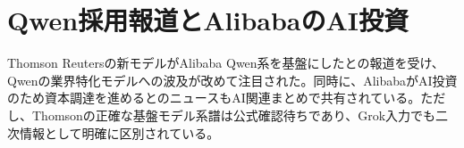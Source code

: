 \section{Qwen採用報道とAlibabaのAI投資}
Thomson Reutersの新モデルがAlibaba Qwen系を基盤にしたとの報道を受け、Qwenの業界特化モデルへの波及が改めて注目された。同時に、AlibabaがAI投資のため資本調達を進めるとのニュースもAI関連まとめで共有されている。ただし、Thomsonの正確な基盤モデル系譜は公式確認待ちであり、Grok入力でも二次情報として明確に区別されている。
